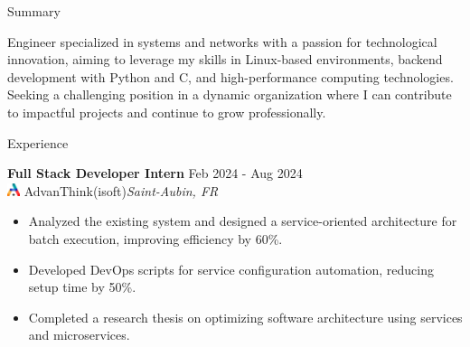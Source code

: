 \documentclass{resume}
\begin{document}
\vspace{-2em}
\begin{rSection}{Summary}

{Engineer specialized in systems and networks with a passion for technological innovation, aiming to leverage my skills in Linux-based environments, backend development with Python and C, and high-performance computing technologies. Seeking a challenging position in a dynamic organization where I can contribute to impactful projects and continue to grow professionally.}

\end{rSection}
\vspace{-0.75em}
\begin{rSection}{Experience}

    \textbf{Full Stack Developer Intern} \hfill Feb 2024 - Aug 2024\\
    \href{https://www.advanthink.com}{\includegraphics[height=1em]{../Ressource/Logo Symbol A en couleur.png}} AdvanThink(isoft)\hfill \textit{Saint-Aubin, FR}
     \begin{itemize}
        \itemsep -3pt {} 
        \item Analyzed the existing system and designed a service-oriented architecture for batch execution, improving efficiency by 60\%.
        \item Developed DevOps scripts for service configuration automation, reducing setup time by 50\%.
        \item Completed a research thesis on optimizing software architecture using services and microservices.
     \end{itemize}
    \end{rSection} 
    \vspace{-0.75em}
\end{document}
